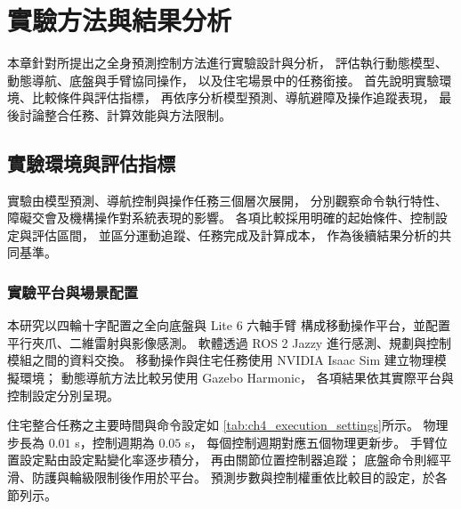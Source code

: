 \chapter{實驗方法與結果分析}
\label{c:experiments}

本章針對所提出之全身預測控制方法進行實驗設計與分析，
評估執行動態模型、動態導航、底盤與手臂協同操作，
以及住宅場景中的任務銜接。
首先說明實驗環境、比較條件與評估指標，
再依序分析模型預測、導航避障及操作追蹤表現，
最後討論整合任務、計算效能與方法限制。

\section{實驗環境與評估指標}
\label{sec:experimental_setup_metrics}

實驗由模型預測、導航控制與操作任務三個層次展開，
分別觀察命令執行特性、障礙交會及機構操作對系統表現的影響。
各項比較採用明確的起始條件、控制設定與評估區間，
並區分運動追蹤、任務完成及計算成本，
作為後續結果分析的共同基準。

\subsection{實驗平台與場景配置}
\label{subsec:experimental_platform_scenarios}

本研究以四輪十字配置之全向底盤與 Lite 6 六軸手臂
構成移動操作平台，並配置平行夾爪、二維雷射與影像感測。
軟體透過 ROS 2 Jazzy
進行感測、規劃與控制模組之間的資料交換\cite{macenski2022ros2}。
移動操作與住宅任務使用 NVIDIA Isaac Sim
建立物理模擬環境\cite{nvidiaisaacsim}；
動態導航方法比較另使用 Gazebo Harmonic，
各項結果依其實際平台與控制設定分別呈現。

住宅整合任務之主要時間與命令設定如
\cref{tab:ch4_execution_settings}所示。
物理步長為 $0.01$ s，控制週期為 $0.05$ s，
每個控制週期對應五個物理更新步。
手臂位置設定點由設定點變化率逐步積分，
再由關節位置控制器追蹤；
底盤命令則經平滑、防護與輪級限制後作用於平台。
預測步數與控制權重依比較目的設定，於各節列示。

